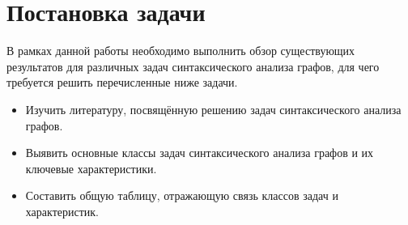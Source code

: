 \section{Постановка задачи}
В рамках данной работы необходимо выполнить обзор существующих результатов для различных задач синтаксического анализа графов, для чего требуется решить перечисленные ниже задачи.
\begin{itemize}
    \item Изучить литературу, посвящённую решению задач синтаксического анализа графов.
    \item Выявить основные классы задач синтаксического анализа графов и их ключевые характеристики.
    \item Составить общую таблицу, отражающую связь классов задач и характеристик.
\end{itemize}